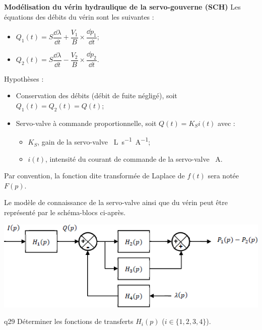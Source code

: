 \begin{multicols}{2}
\textbf{Modélisation du vérin hydraulique de la servo-gouverne (SCH)}
Les équations des débits du vérin sont les suivantes :
\begin{itemize}
\item $Q_1(t)=S\dfrac{\dd \lambda}{\dd t}+\dfrac{V_1}{B}\times \dfrac{\dd p_1}{\dd t}$;

\item $Q_2(t)=S\dfrac{\dd \lambda}{\dd t}-\dfrac{V_2}{B}\times \dfrac{\dd p_2}{\dd t}$.
\end{itemize}

Hypothèses : 
\begin{itemize}
\item Conservation des débits (débit de fuite négligé), soit $Q_1(t)=Q_2(t)=Q(t)$;
\item Servo-valve à commande proportionnelle, soit $Q(t)=K_Si(t)$ avec :
\begin{itemize}
\item $K_S$, gain de la servo-valve \SI{}{L.s^{-1}.A^{-1}};
\item $i(t)$, intensité du courant de commande de la servo-valve \SI{}{A}.
\end{itemize}
\end{itemize}
Par convention, la fonction dite transformée de Laplace de $f(t)$ sera notée $F(p)$.




Le modèle de connaissance de la servo-valve ainsi que du vérin peut être représenté par le schéma-blocs ci-après.

\begin{center}
\includegraphics[width=\linewidth]{images/fig_11}
\end{center}

{\begin{question}{q29}
Déterminer les fonctions de transferts $H_i(p)$ ($i\in \{1,2,3,4\}$).
\ifprof
\begin{corrige}
\end{corrige}
\else
\fi
\begin{reponses}
\end{reponses} \end{question}}  


\end{multicols}
